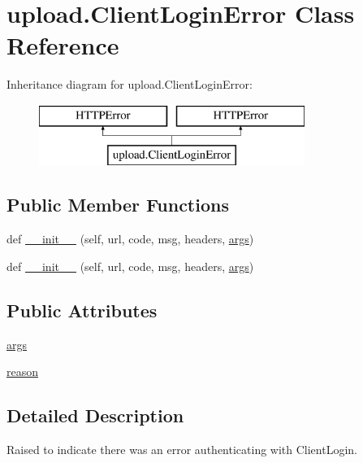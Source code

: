 \hypertarget{classupload_1_1_client_login_error}{}\section{upload.\+Client\+Login\+Error Class Reference}
\label{classupload_1_1_client_login_error}
Inheritance diagram for upload.\+Client\+Login\+Error\+:\begin{figure}[H]
\begin{center}
\leavevmode
\includegraphics[height=2.000000cm]{d6/dbf/classupload_1_1_client_login_error}
\end{center}
\end{figure}
\subsection*{Public Member Functions}
\begin{DoxyCompactItemize}
\item 
def \mbox{\hyperlink{classupload_1_1_client_login_error_a1e590616c2976d881e155958cedbbe47}{\+\_\+\+\_\+init\+\_\+\+\_\+}} (self, url, code, msg, headers, \mbox{\hyperlink{classupload_1_1_client_login_error_ac300a0b034b2bc64cedc51e09fb6d663}{args}})
\item 
def \mbox{\hyperlink{classupload_1_1_client_login_error_a1e590616c2976d881e155958cedbbe47}{\+\_\+\+\_\+init\+\_\+\+\_\+}} (self, url, code, msg, headers, \mbox{\hyperlink{classupload_1_1_client_login_error_ac300a0b034b2bc64cedc51e09fb6d663}{args}})
\end{DoxyCompactItemize}
\subsection*{Public Attributes}
\begin{DoxyCompactItemize}
\item 
\mbox{\hyperlink{classupload_1_1_client_login_error_ac300a0b034b2bc64cedc51e09fb6d663}{args}}
\item 
\mbox{\hyperlink{classupload_1_1_client_login_error_ae0555feb182d89d1e4d7944afbfe14e5}{reason}}
\end{DoxyCompactItemize}


\subsection{Detailed Description}
\begin{DoxyVerb}Raised to indicate there was an error authenticating with ClientLogin.\end{DoxyVerb}
 

